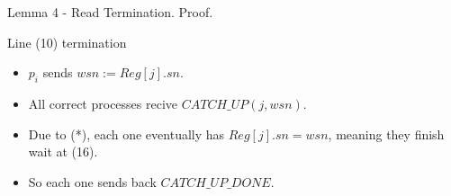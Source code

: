\begin{frame}{Lemma 4 - Read Termination. Proof.}
    \begin{block}{Line (10) termination}
        \begin{itemize}
            \item $p_i$ sends $wsn:=Reg[j].sn$.
            \item All correct processes recive $CATCH\_UP(j,wsn)$.
            \item Due to (*), each one eventually has $Reg[j].sn = wsn$, meaning they finish wait at (16).
            \item So each one sends back $CATCH\_UP\_DONE$.
        \end{itemize}
    \end{block}
\end{frame}


